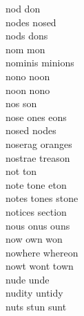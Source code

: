 nod don\\
nodes nosed\\
nods dons\\
nom mon\\
nominis minions\\
nono noon\\
noon nono\\
nos son\\
nose ones eons\\
nosed nodes\\
noserag oranges\\
nostrae treason\\
not ton\\
note tone eton\\
notes tones stone\\
notices section\\
nous onus ouns\\
now own won\\
nowhere whereon\\
nowt wont town\\
nude unde\\
nudity untidy\\
nuts stun sunt\\

